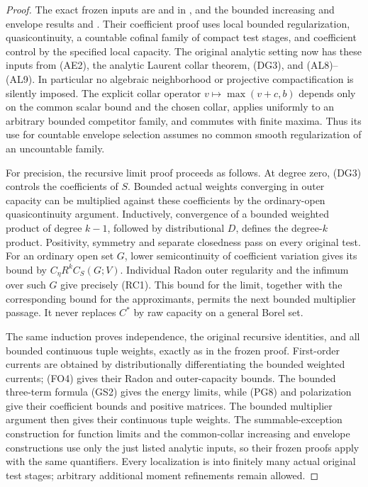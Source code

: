 \documentclass[11pt,a4paper]{article}
\numberwithin{equation}{section}
\theoremstyle{definition}
\theoremstyle{remark}
\begin{document}
\begin{proof}
The exact frozen inputs are
 and
 in
, and the bounded increasing
and envelope results
 and
.
Their coefficient proof uses local bounded regularization,
quasicontinuity, a countable cofinal family of compact test
stages, and coefficient control by the specified local capacity.
The original analytic setting now has these inputs from
(AE2), the analytic Laurent collar theorem, (DG3), and
(AL8)--(AL9). In particular no algebraic neighborhood or
projective compactification is silently imposed.
The explicit collar operator $v\mapsto\max(v+c,b)$ depends only
on the common scalar bound and the chosen collar, applies uniformly
to an arbitrary bounded competitor family, and commutes with finite
maxima. Thus its use for countable envelope selection assumes no
common smooth regularization of an uncountable family.

For precision, the recursive limit proof proceeds as follows.
At degree zero, (DG3) controls the coefficients of $S$.
Bounded actual weights converging in outer capacity can be
multiplied against these coefficients by the ordinary-open
quasicontinuity argument. Inductively, convergence of a bounded
weighted product of degree $k-1$, followed by distributional
$D$, defines the degree-$k$ product. Positivity, symmetry and
separate closedness pass on every original test.
For an ordinary open set $G$, lower semicontinuity of coefficient
variation gives its bound by $C_\eta R^k C_S(G;V)$.
Individual Radon outer regularity and the infimum over such
$G$ give precisely (RC1). This bound for the limit, together
with the corresponding bound for the approximants, permits
the next bounded multiplier passage. It never replaces
$C^*$ by raw capacity on a general Borel set.

The same induction proves independence, the original recursive
identities, and all bounded continuous tuple weights, exactly
as in the frozen proof. First-order currents are obtained by
distributionally differentiating the bounded weighted currents;
(FO4) gives their Radon and outer-capacity bounds. The bounded
three-term formula (GS2) gives the energy limits, while (PG8)
and polarization give their coefficient bounds and positive
matrices. The bounded multiplier argument then gives their
continuous tuple weights. The summable-exception construction
for function limits and the common-collar increasing and
envelope constructions use only the just listed analytic
inputs, so their frozen proofs apply with the same quantifiers.
Every localization is into finitely many actual original test
stages; arbitrary additional moment refinements remain allowed.
\end{proof}
\end{document}
